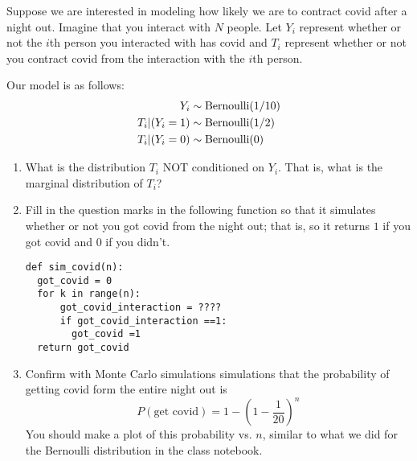 \begin{exercise}
Suppose we are interested in modeling how likely we are to contract covid after a night out. Imagine that you interact with $N$ people. Let $Y_i$ represent whether or not the $i$th person you interacted with has covid and $T_i$ represent whether or not you contract covid from the interaction with the $i$th person. 

Our model is as follows:
\begin{align*}
Y_i &\sim {\rm Bernoulli}(1/10)\\
T_i |(Y_i=1) &\sim {\rm Bernoulli}(1/2)\\
T_i|(Y_i=0) &\sim {\rm Bernoulli}(0)
\end{align*}

\begin{enumerate}[label=(\alph*)]
\item What is the distribution $T_i$ NOT conditioned on $Y_i$.  That is, what is the marginal distribution of $T_i$?
\item Fill in the question marks in the following function so that it simulates whether or not you got covid from the night out; that is, so it returns $1$ if you got covid and $0$ if you didn't.
\begin{Verbatim}
def sim_covid(n):
  got_covid = 0
  for k in range(n):
      got_covid_interaction = ????
      if got_covid_interaction ==1:
        got_covid =1
  return got_covid
\end{Verbatim}
\item  Confirm with Monte Carlo simulations simulations that the probability of getting covid form the entire night out is
\begin{equation}
P(\text{get covid}) = 1-\left(1-\frac{1}{20}\right)^n
\end{equation}
You should make a plot of this probability vs. $n$, similar to what we did for the Bernoulli distribution in the class notebook.
\end{enumerate}
\end{exercise}







